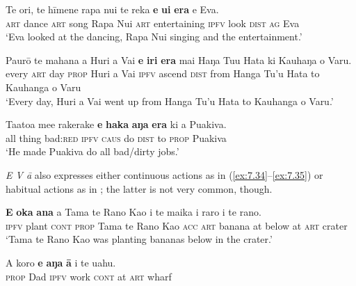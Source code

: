 \ea\label{ex:7.31}
\gll Te {\ꞌ}ori, te hīmene rapa nui te reka \textbf{e} \textbf{u{\ꞌ}i} \textbf{era} e Eva. \\
\textsc{art} dance \textsc{art} song Rapa Nui \textsc{art} entertaining \textsc{ipfv} look \textsc{dist} \textsc{ag} Eva \\

\glt 
‘Eva looked at the dancing, Rapa Nui singing and the entertainment.’ \textstyleExampleref{[R210.133]} 
\z

\ea\label{ex:7.32}
\gll Paurō te mahana a Huri {\ꞌ}a Vai \textbf{e} \textbf{iri} \textbf{era} mai Haŋa Tu{\ꞌ}u Hata ki Kauhaŋa o Varu.\\
every \textsc{art} day \textsc{prop} Huri a Vai \textsc{ipfv} ascend \textsc{dist} from Hanga Tu’u Hata to Kauhanga o Varu\\

\glt 
‘Every day, Huri a Vai went up from Hanga Tu’u Hata to Kauhanga o Varu.’ \textstyleExampleref{[R304.001]} 
\z

\ea\label{ex:7.33}
\gll Ta{\ꞌ}ato{\ꞌ}a me{\ꞌ}e rakerake \textbf{e} \textbf{haka} \textbf{aŋa} \textbf{era} ki a Puakiva. \\
all thing bad:\textsc{red} \textsc{ipfv} \textsc{caus} do \textsc{dist} to \textsc{prop} Puakiva \\

\glt 
‘He made Puakiva do all bad/dirty jobs.’ \textstyleExampleref{[R229.397]} 
\z

\textit{E V {\ꞌ}ā} also expresses either continuous actions as in (\ref{ex:7.34}–\ref{ex:7.35}) or habitual actions as in ; the latter is not very common, though.

\ea\label{ex:7.34}
\gll \textbf{E} \textbf{{\ꞌ}oka} \textbf{{\ꞌ}ana} a Tama te Rano Kao i te maika {\ꞌ}i raro i te rano. \\
\textsc{ipfv} plant \textsc{cont} \textsc{prop} Tama te Rano Kao \textsc{acc} \textsc{art} banana at below at \textsc{art} crater \\

\glt 
‘Tama te Rano Kao was planting bananas below in the crater.’ \textstyleExampleref{[Mtx-3-11.053]}
\z

\ea\label{ex:7.35}
\gll A koro \textbf{e} \textbf{aŋa} \textbf{{\ꞌ}ā} {\ꞌ}i te {\ꞌ}uahu. \\
\textsc{prop} Dad \textsc{ipfv} work \textsc{cont} at \textsc{art} wharf \\

